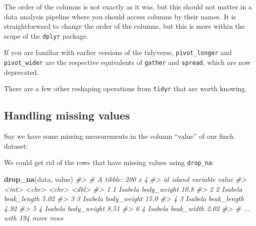 \documentclass[]{book}
\newenvironment{Shaded}{}{}
\newcommand{\CommentTok}[1]{\textcolor[rgb]{0.38,0.63,0.69}{\textit{#1}}}
\newcommand{\DecValTok}[1]{\textcolor[rgb]{0.25,0.63,0.44}{#1}}
\newcommand{\KeywordTok}[1]{\textcolor[rgb]{0.00,0.44,0.13}{\textbf{#1}}}
\newcommand{\NormalTok}[1]{#1}
\newcommand{\OperatorTok}[1]{\textcolor[rgb]{0.40,0.40,0.40}{#1}}
\newcommand{\OtherTok}[1]{\textcolor[rgb]{0.00,0.44,0.13}{#1}}
\newcommand{\StringTok}[1]{\textcolor[rgb]{0.25,0.44,0.63}{#1}}
\begin{document}
The order of the columns is not exactly as it was, but this should not matter in a data analysis pipeline where you should access columns by their names. It is straightforward to change the order of the columns, but this is more within the scope of the \texttt{dplyr} package.

If you are familiar with earlier versions of the tidyverse, \texttt{pivot\_longer} and \texttt{pivot\_wider} are the respective equivalents of \texttt{gather} and \texttt{spread}, which are now deprecated.

There are a few other reshaping operations from \texttt{tidyr} that are worth knowing.

\hypertarget{handling-missing-values}{%
\subsection{Handling missing values}\label{handling-missing-values}}

Say we have some missing measurements in the column ``value'' of our finch dataset:

\begin{Shaded}
\end{Shaded}

We could get rid of the rows that have missing values using \texttt{drop\_na}:

\begin{Shaded}
\begin{Highlighting}[]
\KeywordTok{drop_na}\NormalTok{(data, value)}
\CommentTok{#> # A tibble: 200 x 4}
\CommentTok{#>      id island  variable    value}
\CommentTok{#>   <int> <chr>   <chr>       <dbl>}
\CommentTok{#> 1     1 Isabela body_weight 10.8 }
\CommentTok{#> 2     2 Isabela beak_length  5.02}
\CommentTok{#> 3     3 Isabela body_weight 15.0 }
\CommentTok{#> 4     3 Isabela beak_length  4.92}
\CommentTok{#> 5     4 Isabela body_weight  8.51}
\CommentTok{#> 6     4 Isabela beak_width   2.02}
\CommentTok{#> # ... with 194 more rows}
\end{Highlighting}
\end{Shaded}
\end{document}
